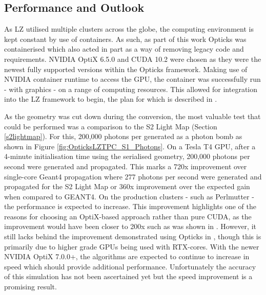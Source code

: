 \subsection{Performance and Outlook}
\par
As LZ utilised multiple clusters across the globe, the computing environment is kept constant by use of containers.
As such, as part of this work Opticks was containerised \cite{opticks_docker_ref} which also acted in part as a way of removing legacy code and requirements.
NVIDIA OptiX 6.5.0 and CUDA 10.2 were chosen as they were the newest fully supported versions within the Opticks framework.
Making use of NVIDIA container runtime to access the GPU, the container was successfully run - with graphics - on a range of computing resources.
This allowed for integration into the LZ framework to begin, the plan for which is described in \cite{SEriksen_Opticks_CHEP_2021_ref,lz_status_with_opticks_ref}.
\par
As the geometry was cut down during the conversion, the most valuable test that could be performed was a comparison to the S2 Light Map (Section \ref{s2lightmap}).
For this, 200,000 photons per generated as a photon bomb as shown in Figure \ref{fig:OpticksLZTPC_S1_Photons}.
On a Tesla T4 GPU, after a 4-minute initialisation time using the serialised geometry, 200,000 photons per second were generated and propagated.
This marks a 720x improvement over single-core Geant4 propagation where 277 photons per second were generated and propagated for the S2 Light Map or 360x improvement over the expected gain when compared to GEANT4.
On the production clusters - such as Perlmutter - the performance is expected to increase.
This improvement highlights one of the reasons for choosing an OptiX-based approach rather than pure CUDA, as the improvement would have been closer to 200x such as was shown in \cite{chroma_presentation_ref}.
However, it still lacks behind the improvement demonstrated using Opticks in \cite{Opticks_CHEP_2019_ref}, though this is primarily due to higher grade GPUs being used with RTX-cores.
With the newer NVIDIA OptiX 7.0.0+, the algorithms are expected to continue to increase in speed which should provide additional performance.
Unfortunately the accuracy of this simulation has not been ascertained yet but the speed improvement is a promising result.
